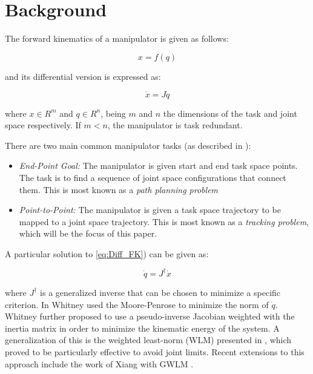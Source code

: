 \documentclass[conference]{IEEEtran}
\newcommand{\J}{\ensuremath{J}}
\newcommand{\Jps}{\ensuremath{J^{\dagger}}}
\newcommand{\dx}{\ensuremath{\dot{x}}}
\newcommand{\dq}{\ensuremath{\dot{q}}}
\newcommand{\q}{\ensuremath{q}}
\begin{document}
\section{Background}
\label{sec:Background}
The forward kinematics of a manipulator is given as follows:

\begin{equation}
x = f(\q)
\label{eq:FK}
\end{equation}

and its differential version is expressed as:

\begin{equation}
\dot{x} = \J \dq
\label{eq:Diff_FK}
\end{equation}

where $x \in R^{m}$ and $\q \in R^{n}$, being $m$ and $n$ the dimensions
of the task and joint space respectively. If $m < n$, the manipulator is
task redundant. 

There are two main common manipulator tasks (as described in \cite{seereeram-ns-1995}):

\begin{itemize}
\item{\textit{End-Point Goal:} The manipulator is given start and end task space points. 
The task is to find a sequence of joint space configurations that connect them. 
This is most known as a \textit{path planning problem} } 
\item{\textit{Point-to-Point:} The manipulator is given a task space trajectory to be mapped
to a joint space trajectory. This is most known as a \textit{tracking problem}, which will be 
the focus of this paper.}
\end{itemize}

A particular solution to \ref{eq:Diff_FK}) can be given as:

\begin{equation}
\dq = \Jps \dx
\label{eq:IK_ParticularSol}
\end{equation}

where $\Jps$ is a generalized inverse that can be chosen to minimize a specific criterion. 
In \cite{Whitney-motionRate-1969} Whitney used the Moore-Penrose to minimize the norm of $\dq$. 
Whitney further proposed to use a pseudo-inverse Jacobian weighted with the inertia matrix in 
order to minimize the kinematic energy of the system. A generalization of this is the weighted 
least-norm (WLM) presented in \cite{chan-ns-1995}, which proved to be particularly effective 
to avoid joint limits. Recent extensions to this approach include the work of Xiang with GWLM 
\cite{xiang-ns-2010}.  
\end{document}
